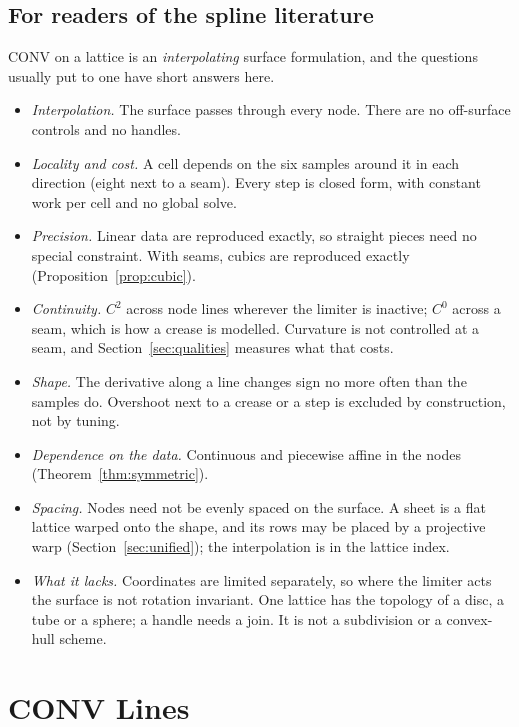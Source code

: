 \documentclass[journal]{IEEEtran}
\begin{document}
\subsection{For readers of the spline literature}

CONV on a lattice is an \emph{interpolating} surface formulation, and the
questions usually put to one have short answers here.
\begin{itemize}
\item \emph{Interpolation.} The surface passes through every node. There
are no off-surface controls and no handles.
\item \emph{Locality and cost.} A cell depends on the six samples around
it in each direction (eight next to a seam). Every step is closed form,
with constant work per cell and no global solve.
\item \emph{Precision.} Linear data are reproduced exactly, so straight
pieces need no special constraint. With seams, cubics are reproduced
exactly (Proposition~\ref{prop:cubic}).
\item \emph{Continuity.} $C^2$ across node lines wherever the limiter is
inactive; $C^0$ across a seam, which is how a crease is modelled.
Curvature is not controlled at a seam, and Section~\ref{sec:qualities}
measures what that costs.
\item \emph{Shape.} The derivative along a line changes sign no more often
than the samples do. Overshoot next to a crease or a step is excluded by
construction, not by tuning.
\item \emph{Dependence on the data.} Continuous and piecewise affine in the
nodes (Theorem~\ref{thm:symmetric}).
\item \emph{Spacing.} Nodes need not be evenly spaced on the surface. A
sheet is a flat lattice warped onto the shape, and its rows may be placed
by a projective warp (Section~\ref{sec:unified}); the interpolation is in
the lattice index.
\item \emph{What it lacks.} Coordinates are limited separately, so where
the limiter acts the surface is not rotation invariant. One lattice has
the topology of a disc, a tube or a sphere; a handle needs a join. It is
not a subdivision or a convex-hull scheme.
\end{itemize}

\section{CONV Lines}
\end{document}

